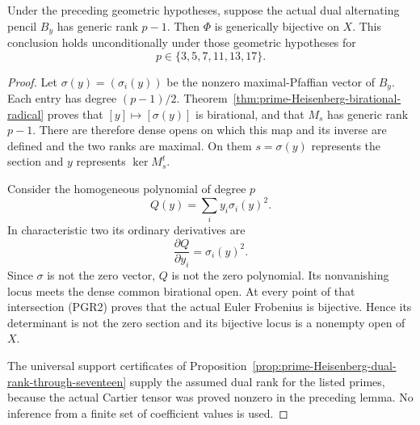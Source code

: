 \begin{proposition}
\label{prop:primitive-prime-generic-Euler}
Under the preceding geometric hypotheses, suppose the actual
dual alternating pencil \(B_y\) has generic rank \(p-1\).
Then \(\Phi\) is generically bijective on \(X\).
This conclusion holds unconditionally under those geometric
hypotheses for
\[
                         p\in\{3,5,7,11,13,17\}.   \tag{PGR4}
\]
\end{proposition}
\begin{proof}
Let \(\sigma(y)=(\sigma_i(y))\) be the nonzero maximal-Pfaffian
vector of \(B_y\). Each entry has degree \((p-1)/2\).
Theorem~\ref{thm:prime-Heisenberg-birational-radical} proves that
\([y]\mapsto[\sigma(y)]\) is birational, and that \(M_s\)
has generic rank \(p-1\). There are therefore dense opens on
which this map and its inverse are defined and the two ranks
are maximal. On them \(s=\sigma(y)\) represents the section
and \(y\) represents \(\ker M_s^t\).

Consider the homogeneous polynomial of degree \(p\)
\[
                       Q(y)=\sum_i y_i\sigma_i(y)^2.
                                                        \tag{PGR5}
\]
In characteristic two its ordinary derivatives are
\[
                           \frac{\partial Q}{\partial y_i}
                                    =\sigma_i(y)^2.  \tag{PGR6}
\]
Since \(\sigma\) is not the zero vector, \(Q\) is not the
zero polynomial. Its nonvanishing locus meets the dense common
birational open. At every point of that intersection (PGR2)
proves that the actual Euler Frobenius is bijective. Hence its
determinant is not the zero section and its bijective locus is
a nonempty open of \(X\).

The universal support certificates of
Proposition~\ref{prop:prime-Heisenberg-dual-rank-through-seventeen}
supply the assumed dual rank for the listed primes, because the
actual Cartier tensor was proved nonzero in the preceding lemma.
No inference from a finite set of coefficient values is used.
\end{proof}

